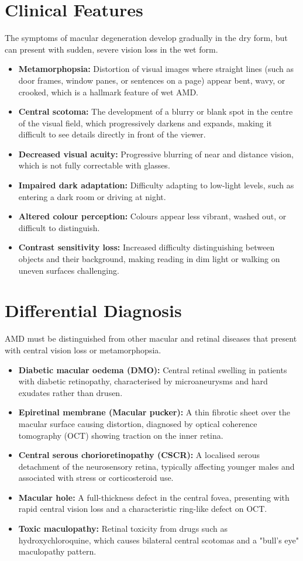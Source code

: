 \section*{Clinical Features}
The symptoms of macular degeneration develop gradually in the dry form, but can present with sudden, severe vision loss in the wet form.
\begin{itemize}
    \item \textbf{Metamorphopsia:} Distortion of visual images where straight lines (such as door frames, window panes, or sentences on a page) appear bent, wavy, or crooked, which is a hallmark feature of wet AMD.
    \item \textbf{Central scotoma:} The development of a blurry or blank spot in the centre of the visual field, which progressively darkens and expands, making it difficult to see details directly in front of the viewer.
    \item \textbf{Decreased visual acuity:} Progressive blurring of near and distance vision, which is not fully correctable with glasses.
    \item \textbf{Impaired dark adaptation:} Difficulty adapting to low-light levels, such as entering a dark room or driving at night.
    \item \textbf{Altered colour perception:} Colours appear less vibrant, washed out, or difficult to distinguish.
    \item \textbf{Contrast sensitivity loss:} Increased difficulty distinguishing between objects and their background, making reading in dim light or walking on uneven surfaces challenging.
\end{itemize}

\section*{Differential Diagnosis}
AMD must be distinguished from other macular and retinal diseases that present with central vision loss or metamorphopsia.
\begin{itemize}
    \item \textbf{Diabetic macular oedema (DMO):} Central retinal swelling in patients with diabetic retinopathy, characterised by microaneurysms and hard exudates rather than drusen.
    \item \textbf{Epiretinal membrane (Macular pucker):} A thin fibrotic sheet over the macular surface causing distortion, diagnosed by optical coherence tomography (OCT) showing traction on the inner retina.
    \item \textbf{Central serous chorioretinopathy (CSCR):} A localised serous detachment of the neurosensory retina, typically affecting younger males and associated with stress or corticosteroid use.
    \item \textbf{Macular hole:} A full-thickness defect in the central fovea, presenting with rapid central vision loss and a characteristic ring-like defect on OCT.
    \item \textbf{Toxic maculopathy:} Retinal toxicity from drugs such as hydroxychloroquine, which causes bilateral central scotomas and a "bull's eye" maculopathy pattern.
\end{itemize}

